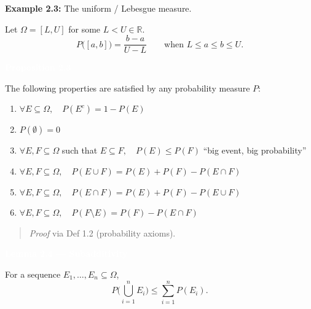 \documentclass[11pt]{article}
\newcommand{\deftitle}[1]{%
  \vspace{0.6em}
  \noindent\colorbox{defbg!70}{\parbox{\dimexpr\textwidth-2\fboxsep}{\textbf{\textcolor{white}{#1}}}}
  \vspace{0.4em}
}
\newenvironment{proofnote}{\begin{quote}\color{noteyellow}}{\end{quote}}
\begin{document}
\noindent \textbf{Example 2.3:} The uniform / Lebesgue measure.

Let $\Omega = [L, U]$ for some $L < U \in \mathbb{R}$.
\[
P\big([a,b]\big) = \frac{b-a}{U-L} \qquad \text{when } L \le a \le b \le U.
\]

\deftitle{Proposition 2.3}

The following properties are satisfied by any probability measure $P$:

\begin{enumerate}
  \item $\forall E \subseteq \Omega,\quad P(E^c) = 1 - P(E)$
  \item $P(\emptyset) = 0$
  \item $\forall E, F \subseteq \Omega$ such that $E \subseteq F,\quad P(E) \le P(F)$ \hfill {\small\textcolor{notepink}{``big event, big probability''}}
  \item $\forall E, F \subseteq \Omega,\quad P(E \cup F) = P(E) + P(F) - P(E \cap F)$
  \item $\forall E, F \subseteq \Omega,\quad P(E \cap F) = P(E) + P(F) - P(E \cup F)$
  \item $\forall E, F \subseteq \Omega,\quad P(F \setminus E) = P(F) - P(E \cap F)$
\end{enumerate}

\begin{proofnote}
\textit{Proof} via Def 1.2 (probability axioms).
\end{proofnote}

\deftitle{Lemma 2.4 --- Subadditivity}

For a sequence $E_1, \ldots, E_n \subseteq \Omega$,
\[
P\Big(\bigcup_{i=1}^{n} E_i\Big) \le \sum_{i=1}^{n} P(E_i).
\]
\end{document}

